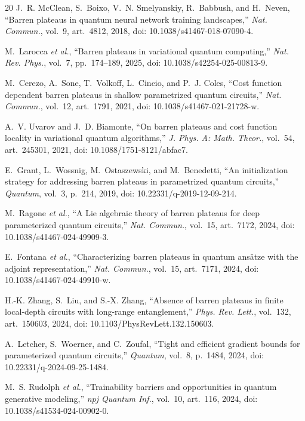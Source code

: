 \documentclass[conference]{IEEEtran}
\begin{document}
\begin{thebibliography}{20}
J.~R. McClean, S.~Boixo, V.~N. Smelyanskiy, R.~Babbush, and H.~Neven,
``Barren plateaus in quantum neural network training landscapes,''
\emph{Nat. Commun.}, vol.~9, art.~4812, 2018, doi: 10.1038/s41467-018-07090-4.

M.~Larocca \emph{et al.},
``Barren plateaus in variational quantum computing,''
\emph{Nat. Rev. Phys.}, vol.~7, pp.~174--189, 2025, doi: 10.1038/s42254-025-00813-9.

M.~Cerezo, A.~Sone, T.~Volkoff, L.~Cincio, and P.~J. Coles,
``Cost function dependent barren plateaus in shallow parametrized quantum circuits,''
\emph{Nat. Commun.}, vol.~12, art.~1791, 2021, doi: 10.1038/s41467-021-21728-w.

A.~V. Uvarov and J.~D. Biamonte,
``On barren plateaus and cost function locality in variational quantum algorithms,''
\emph{J. Phys. A: Math. Theor.}, vol.~54, art.~245301, 2021, doi: 10.1088/1751-8121/abfac7.

E.~Grant, L.~Wossnig, M.~Ostaszewski, and M.~Benedetti,
``An initialization strategy for addressing barren plateaus in parametrized quantum circuits,''
\emph{Quantum}, vol.~3, p.~214, 2019, doi: 10.22331/q-2019-12-09-214.

M.~Ragone \emph{et al.},
``A Lie algebraic theory of barren plateaus for deep parameterized quantum circuits,''
\emph{Nat. Commun.}, vol.~15, art.~7172, 2024, doi: 10.1038/s41467-024-49909-3.

E.~Fontana \emph{et al.},
``Characterizing barren plateaus in quantum ans\"atze with the adjoint representation,''
\emph{Nat. Commun.}, vol.~15, art.~7171, 2024, doi: 10.1038/s41467-024-49910-w.

H.-K. Zhang, S.~Liu, and S.-X. Zhang,
``Absence of barren plateaus in finite local-depth circuits with long-range entanglement,''
\emph{Phys. Rev. Lett.}, vol.~132, art.~150603, 2024, doi: 10.1103/PhysRevLett.132.150603.

A.~Letcher, S.~Woerner, and C.~Zoufal,
``Tight and efficient gradient bounds for parameterized quantum circuits,''
\emph{Quantum}, vol.~8, p.~1484, 2024, doi: 10.22331/q-2024-09-25-1484.

M.~S. Rudolph \emph{et al.},
``Trainability barriers and opportunities in quantum generative modeling,''
\emph{npj Quantum Inf.}, vol.~10, art.~116, 2024, doi: 10.1038/s41534-024-00902-0.


\end{thebibliography}
\end{document}

